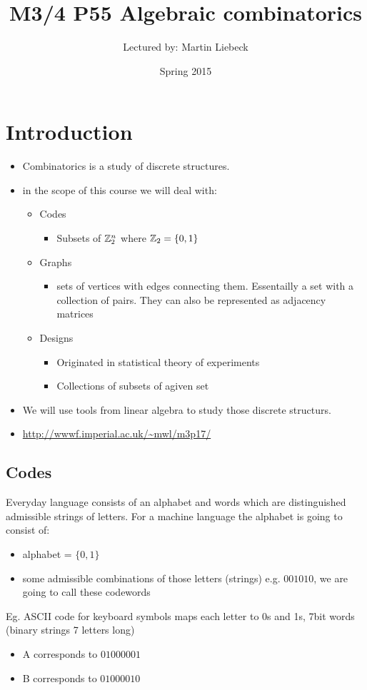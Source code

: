 \documentclass[]{article}
\title{M3/4 P55 Algebraic combinatorics}
\date{Spring 2015}
\author{Lectured by: Martin Liebeck}
\theoremstyle{definition}
\theoremstyle{remark}
\numberwithin{equation}{section}
\begin{document}
\maketitle

\tableofcontents

\setcounter{section}{-1}
\newpage
\section{Introduction}
	\begin{itemize}
		\item Combinatorics is a study of discrete structures.
		\item in the scope of this course we will deal with:
		\begin{itemize}
			\item Codes
				\begin{itemize}
				\item Subsets of $\mathbb{Z}_2^n$ where $\mathbb{Z}_2 = \{0,1\}$
				\end{itemize}
			\item Graphs
				\begin{itemize}
				\item sets of vertices with edges connecting them. Essentailly a set with a collection of pairs. They can also be represented as adjacency matrices
				\end{itemize}
			\item Designs
				\begin{itemize}
					\item Originated in statistical theory of experiments
					\item Collections of subsets of agiven set
				\end{itemize}
		\end{itemize}
		\item We will use tools from linear algebra to study those discrete structurs.
		\item \url{http://wwwf.imperial.ac.uk/~mwl/m3p17/}
	\end{itemize}

	\subsection{Codes}
		Everyday language consists of an alphabet and words which are distinguished admissible strings of letters. For a machine language the alphabet is going to consist of:
		\begin{itemize}
			\item alphabet = $\{0,1\}$
			\item some admissible combinations of those letters (strings) e.g. $001010$, we are going to call these codewords
		\end{itemize}
		Eg. ASCII code for keyboard symbols maps each letter to 0s and 1s, 7bit words (binary strings 7 letters long)
		\begin{itemize}
			\item A corresponds to $01000001$
			\item B corresponds to $01000010$
		\end{itemize}
\end{document}
